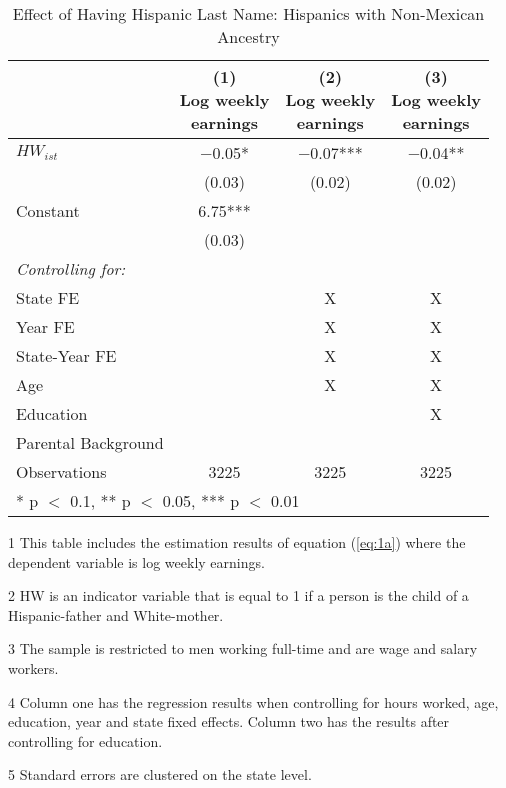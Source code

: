 \begin{table}[H]
\centering\centering
\caption{Effect of Having Hispanic Last Name: Hispanics with Non-Mexican Ancestry  \label{tab:lastnamereg-weekearm-nonmex}}
\centering
\begin{threeparttable}
\begin{tabular}[t]{lccc}
\toprule
  & \specialcell{(1) \\ Log weekly \\ earnings} & \specialcell{(2) \\ Log weekly \\ earnings} & \specialcell{(3) \\  Log weekly \\ earnings}\\
\midrule
$HW_{ist}$ & \num{-0.05}* & \num{-0.07}*** & \num{-0.04}**\\
 & (\num{0.03}) & (\num{0.02}) & (\num{0.02})\\
Constant & \num{6.75}*** &  & \\
 & (\num{0.03}) &  & \\
\midrule
\textit{Controlling for:} &  &  & \\
State FE &  & X & X\\
Year FE &  & X & X\\
State-Year FE &  & X & X\\
Age &  & X & X\\
Education &  &  & X\\
Parental Background &  &  & \\
Observations & \num{3225} & \num{3225} & \num{3225}\\
\bottomrule
\multicolumn{4}{l}{\rule{0pt}{1em}* p $<$ 0.1, ** p $<$ 0.05, *** p $<$ 0.01}\\
\end{tabular}
\begin{tablenotes}
\item[1] {\footnotesize{This table includes the estimation results of equation (\ref{eq:1a}) where the dependent variable is log weekly earnings.}}
\item[2] {\footnotesize{HW is an indicator variable that is equal to 1 if a person is the child of a Hispanic-father and White-mother.}}
\item[3] {\footnotesize{The sample is restricted to men working full-time and are wage and salary workers.}}
\item[4] {\footnotesize{Column one has the regression results when controlling for hours worked, age, education, year and state fixed effects. Column two has the results after controlling for education.}}
\item[5] {\footnotesize{Standard errors are clustered on the state level.}}
\end{tablenotes}
\end{threeparttable}
\end{table}
